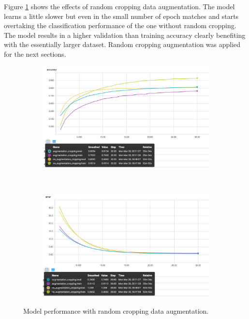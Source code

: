 \documentclass[12pt]{article}
\begin{document}
Figure \ref{fig:aug} shows the effects of random cropping data augmentation. The model learns a little slower but even in the small number of epoch matches and starts overtaking the classification performance of the one without random cropping. The model results in a higher validation than training accuracy clearly benefiting with the essentially larger dataset. Random cropping augmentation was applied for the next sections.

\begin{figure}[ht!]
    \centering
    \begin{subfigure}[t]{0.475\textwidth}
        \centering
        \includegraphics[width=1.0\linewidth]{auga.png}
    \end{subfigure}%
    ~ 
    \begin{subfigure}[t]{0.475\textwidth}
        \centering
        \includegraphics[width=1.0\linewidth]{augt.png}
    \end{subfigure}
    \caption{Model performance with random cropping data augmentation. }
    \label{fig:aug}
\end{figure}
\end{document}
